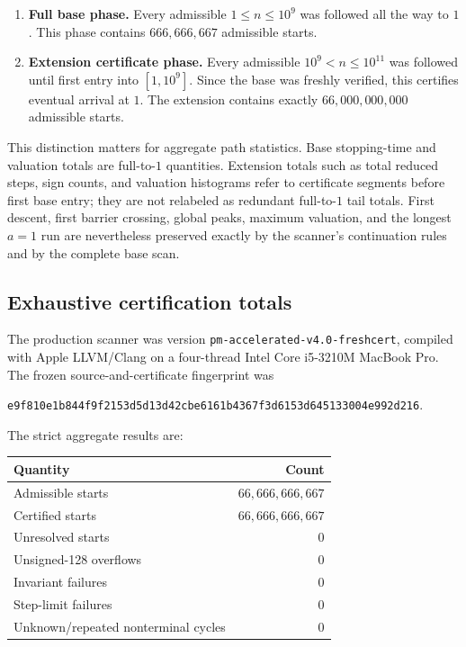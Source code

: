 \documentclass[11pt]{article}
\theoremstyle{definition}
\theoremstyle{remark}
\begin{document}
\begin{enumerate}[leftmargin=2.2em]
\item \textbf{Full base phase.} Every admissible $1\le n\le10^9$ was followed all the way to $1$.  This phase contains $666{,}666{,}667$ admissible starts.
\item \textbf{Extension certificate phase.} Every admissible $10^9<n\le10^{11}$ was followed until first entry into $[1,10^9]$.  Since the base was freshly verified, this certifies eventual arrival at $1$.  The extension contains exactly $66{,}000{,}000{,}000$ admissible starts.
\end{enumerate}

This distinction matters for aggregate path statistics.  Base stopping-time and valuation totals are full-to-$1$ quantities.  Extension totals such as total reduced steps, sign counts, and valuation histograms refer to certificate segments before first base entry; they are not relabeled as redundant full-to-$1$ tail totals.  First descent, first barrier crossing, global peaks, maximum valuation, and the longest $a=1$ run are nevertheless preserved exactly by the scanner's continuation rules and by the complete base scan.

\subsection{Exhaustive certification totals}

The production scanner was version
\texttt{pm-accelerated-v4.0-freshcert}, compiled with Apple LLVM/Clang on a four-thread Intel Core i5-3210M MacBook Pro.  The frozen source-and-certificate fingerprint was
\begin{center}
\small\texttt{e9f810e1b844f9f2153d5d13d42cbe6161b4367f3d6153d645133004e992d216}.
\end{center}

The strict aggregate results are:
\begin{center}
\begin{tabular}{lr}
\toprule
Quantity & Count \\
\midrule
Admissible starts & $66{,}666{,}666{,}667$ \\
Certified starts & $66{,}666{,}666{,}667$ \\
Unresolved starts & $0$ \\
Unsigned-128 overflows & $0$ \\
Invariant failures & $0$ \\
Step-limit failures & $0$ \\
Unknown/repeated nonterminal cycles & $0$ \\
\bottomrule
\end{tabular}
\end{center}
\end{document}
